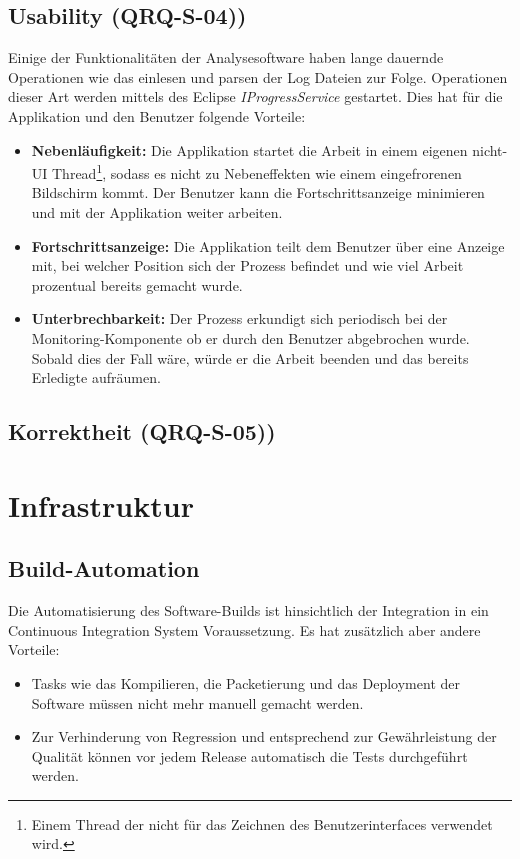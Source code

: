 \subsection{Usability (QRQ-S-04))}
Einige der Funktionalitäten der Analysesoftware haben lange dauernde Operationen wie das einlesen und parsen der Log Dateien zur Folge. Operationen dieser Art werden mittels des Eclipse \textit{IProgressService} gestartet. Dies hat für die Applikation und den Benutzer folgende Vorteile:
\begin{itemize}
	\item \textbf{Nebenläufigkeit:} Die Applikation startet die Arbeit in einem eigenen nicht-UI Thread\footnote{Einem Thread der nicht für das Zeichnen des Benutzerinterfaces verwendet wird.}, sodass es nicht zu Nebeneffekten wie einem eingefrorenen Bildschirm kommt. Der Benutzer kann die Fortschrittsanzeige minimieren und mit der Applikation weiter arbeiten.
	\item \textbf{Fortschrittsanzeige: } Die Applikation teilt dem Benutzer über eine Anzeige mit, bei welcher Position sich der Prozess befindet und wie viel Arbeit prozentual bereits gemacht wurde.
	\item \textbf{Unterbrechbarkeit: } Der Prozess erkundigt sich periodisch bei der Monitoring-Komponente ob er durch den Benutzer abgebrochen wurde. Sobald dies der Fall wäre, würde er die Arbeit beenden und das bereits Erledigte aufräumen.
\end{itemize}


\subsection{Korrektheit (QRQ-S-05))}



\section{Infrastruktur}
\subsection{Build-Automation}
Die Automatisierung des Software-Builds ist hinsichtlich der Integration in ein Continuous Integration System Voraussetzung. Es hat zusätzlich aber andere Vorteile:
\begin{itemize}
	\item Tasks wie das Kompilieren, die Packetierung und das Deployment der Software müssen nicht mehr manuell gemacht werden.
	\item Zur Verhinderung von Regression und entsprechend zur Gewährleistung der Qualität können vor jedem Release automatisch die Tests durchgeführt werden.
\end{itemize}

